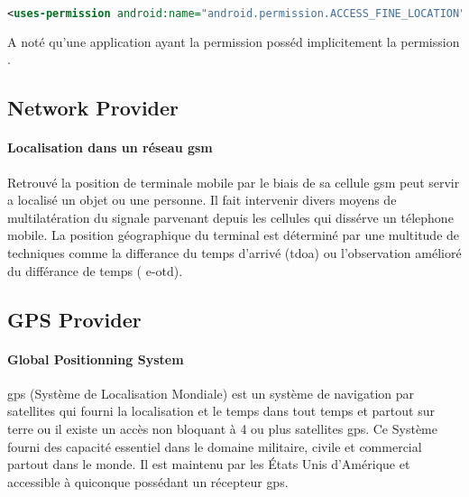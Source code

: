 \begin{lstlisting}[language=xml, caption=permission pour la localisation par GPS.]
<uses-permission android:name="android.permission.ACCESS_FINE_LOCATION"/>
\end{lstlisting}

A noté qu'une application ayant la permission  posséd implicitement la permission . 

\subsection{Network Provider}%

\paragraph{Localisation dans un réseau \gls{gsm} }
Retrouvé la position de terminale mobile par le biais de sa cellule \gls{gsm} peut servir a localisé un objet ou une personne. Il fait intervenir divers moyens de multilatération du signale parvenant depuis les cellules qui dissérve un télephone mobile. La position géographique du terminal est déterminé par une multitude de techniques comme la differance du temps d'arrivé (\gls{tdoa}) ou l'observation amélioré du différance de temps ( \gls{e-otd}).

\subsection{GPS Provider}%
\paragraph{Global Positionning System}\cite{enig:gps}
\gls{gps} (Système de Localisation Mondiale) est un système de navigation par satellites qui fourni la localisation et le temps dans tout temps et partout sur terre ou il existe un accès non bloquant à 4 ou plus satellites \gls{gps}. Ce Système fourni des capacité essentiel dans le domaine militaire, civile et commercial partout dans le monde. Il est maintenu par les États Unis d'Amérique et accessible à quiconque possédant un récepteur \gls{gps}.
